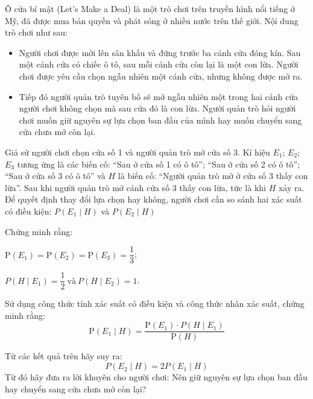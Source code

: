 \begin{vd}%
	Ô cửa bí mật (Let's Make a Deal) là một trò chơi trên truyền hình nổi tiếng ở Mỹ, đã được mua bản quyền và phát sóng ở nhiều nước trên thế giới. Nội dung trò chơi như sau:
	\begin{itemize}
	\item Người chơi được mời lên sân khấu và đứng trước ba cánh cửa đóng kín. Sau một cánh cửa có chiếc ô tô, sau mỗi cánh cửa còn lại là một con lừa. Người chơi được yêu cầu chọn ngẫu nhiên một cánh cửa, nhưng không được mở ra.
	\item Tiếp đó người quản trò tuyên bố sẽ mở ngẫu nhiên một trong hai cánh cửa người chơi không chọn mà sau cửa đó là con lừa. Người quản trò hỏi người chơi muốn giữ nguyên sự lựa chọn ban đầu của mình hay muốn chuyển sang cửa chưa mở còn lại.
	\end{itemize}
	Giả sử người chơi chọn cửa số 1 và người quản trò mở cửa số 3. Kí hiệu $E_1$; $E_2$; $E_3$ tương ứng là các biến cố: ``Sau ở cửa số 1 có ô tô''; ``Sau ở cửa số 2 có ô tô''; ``Sau ở cửa số 3 có ô tô'' và $H$ là biến cố: ``Người quản trò mở ở cửa số 3 thấy con lừa''.
	Sau khi người quản trò mở cánh cửa số 3 thấy con lừa, tức là khi $H$ xảy ra. Để quyết định thay đổi lựa chọn hay không, người chơi cần so sánh hai xác suất có điều kiện: $P\left(E_1\mid H\right)$ và $P\left(E_2\mid H\right)$
	\begin{listEX}
	\item Chứng minh rằng:
	\begin{enumEX}[\itemCI]{2}
	\item $\mathrm{P}(E_1)=\mathrm{P}(E_2)=\mathrm{P}(E_3)=\dfrac{1}{3}$;
	\item $P\left(H \mid E_1\right)=\dfrac{1}{2} ~\text{và}~P\left(H \mid E_2\right)=1$.
	\end{enumEX}
	\item Sử dụng công thức tính xác suất có điều kiện và công thức nhân xác suất, chứng minh rằng:
	$$ \mathrm{P}\left(E_1 \mid H\right)=\dfrac{\mathrm{P}(E_1) \cdot P\left(H \mid E_1\right)}{\mathrm{P}(H)}$$
	\item Từ các kết quả trên hãy suy ra:
	$$P\left(E_2 \mid H\right)=2 P\left(E_1 \mid H\right)$$
	Từ đó hãy đưa ra lời khuyên cho người chơi: Nên giữ nguyên sự lựa chọn ban đầu hay chuyển sang cửa chưa mở còn lại?\\
	\end{listEX}

\end{vd}

